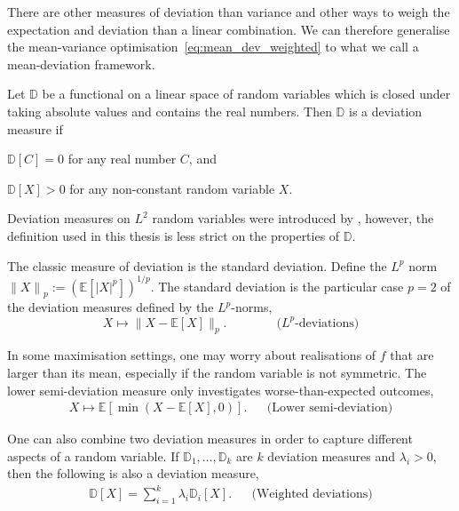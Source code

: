 \documentclass[main.tex]{subfiles}
\begin{document}
There are other measures of deviation than variance and other ways to
weigh the expectation and deviation than a linear combination. We can
therefore generalise the mean-variance
optimisation~\eqref{eq:mean_dev_weighted} to what we call a mean-deviation framework.

\begin{mydef}
  Let $\mathbb{D}$ be a functional on a linear space of random
  variables which is closed under taking absolute values and contains
  the real numbers.
  Then $\mathbb{D}$ is a deviation measure if
  \begin{enumerate}
    \begin{samepage}
    \item $\mathbb{D}[C] = 0$ for any real number $C$, and
    \item $\mathbb{D}[X]>0$ for any non-constant random variable $X$.
    \end{samepage}
  \end{enumerate}
\end{mydef}
Deviation measures on $L^2$ random variables were introduced by
\citet{rockafellar2006generalized}, however, the definition used in this thesis
is less strict on the properties of $\mathbb{D}$.

\begin{example}
  The classic measure of deviation is the standard deviation.
  Define the $L^p$ norm ${\|X\|}_p := {\left( \mathbb{E}[{|X|}^p]
    \right)}^{1/p}$.
  The standard deviation is
  the particular case $p=2$ of the deviation measures defined by
  the $L^p$-norms,
  \begin{equation}
    X\mapsto
    \|X-\mathbb{E}[X]\|_p.
    \qquad\qquad \text{($L^p$-deviations)}
  \end{equation}

  In some maximisation settings, one may worry about
  realisations of $f$ that are larger than its mean, especially if the
  random variable is not symmetric.
  The lower semi-deviation measure only investigates
  worse-than-expected outcomes,
  \begin{align}
    X\mapsto \mathbb{E}[\min(X-\mathbb{E}[X],0)].
    &&\text{(Lower semi-deviation)}
  \end{align}

  One can also combine two deviation measures in order to capture
  different aspects of a random variable.
  If $\mathbb{D}_1,\dots,\mathbb{D}_k$ are $k$ deviation measures and
  $\lambda_i>0$, then the following
  is also a deviation measure,
  \begin{align}
    \mathbb{D}[X]=\sum_{i=1}^k\lambda_i\mathbb{D}_i[X].
    &&\text{(Weighted deviations)}
  \end{align}
\end{example}
\end{document}
